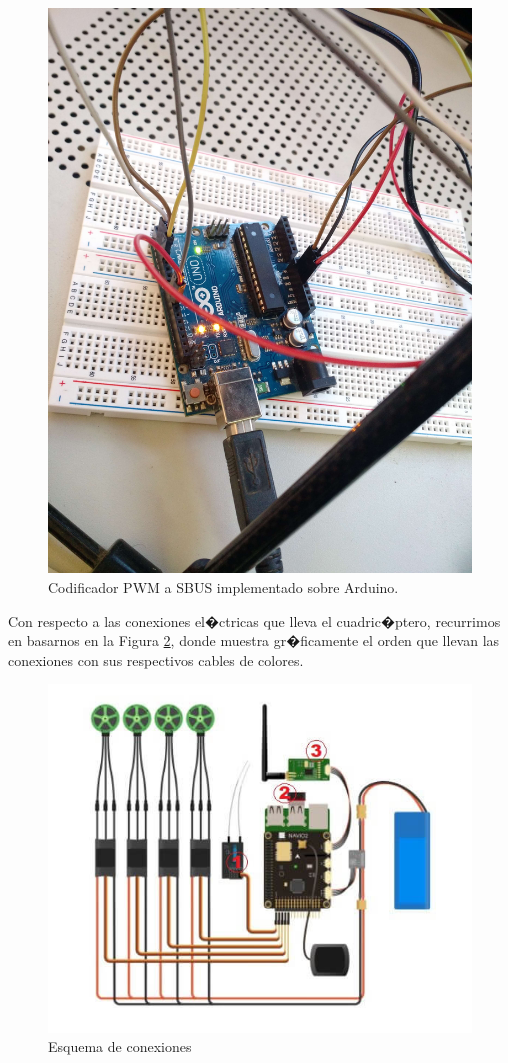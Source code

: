 		\begin{figure}[h!]
		\centering
		\includegraphics[width=0.5\linewidth, height=0.3\textheight]{Imagenes/fotos/arduino_ppm}
		\caption{Codificador PWM a SBUS implementado sobre Arduino.}
		\label{fig:arduino_ppm}
		\end{figure}
		
		
		\par Con respecto a las conexiones el�ctricas que lleva el cuadric�ptero, recurrimos en basarnos en la Figura \ref{fig:instnavio1}, donde muestra gr�ficamente el orden que llevan las conexiones con sus respectivos cables de colores. 
		
		\begin{figure}[h!]
		\centering
		\includegraphics[width=0.9\linewidth, height=0.4\textheight]{Imagenes/inst_navio1}
		\caption{Esquema de conexiones}
		\label{fig:instnavio1}
		\end{figure}
		
